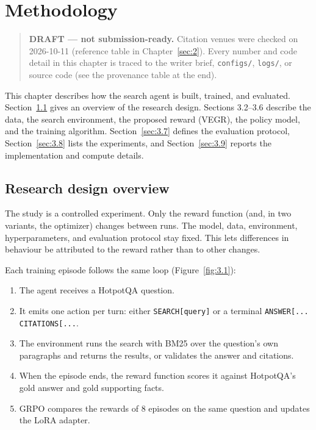 \chapter{Methodology}\label{sec:3}

\begin{quote}
\textbf{DRAFT --- not submission-ready.} Citation venues were checked on
2026-10-11 (reference table in Chapter~\ref{sec:2}). Every number and
code detail in this chapter is traced to the writer brief,
\texttt{configs/\allowbreak{}}, \texttt{logs/\allowbreak{}}, or source
code (see the provenance table at the end).
\end{quote}

This chapter describes how the search agent is built, trained, and
evaluated. Section~\ref{sec:3.1} gives an overview of the research
design. Sections 3.2--3.6 describe the data, the search environment, the
proposed reward (VEGR), the policy model, and the training algorithm.
Section~\ref{sec:3.7} defines the evaluation protocol,
Section~\ref{sec:3.8} lists the experiments, and Section~\ref{sec:3.9}
reports the implementation and compute details.

\section{Research design overview}\label{sec:3.1}

The study is a controlled experiment. Only the reward function (and, in
two variants, the optimizer) changes between runs. The model, data,
environment, hyperparameters, and evaluation protocol stay fixed. This
lets differences in behaviour be attributed to the reward rather than to
other changes.

Each training episode follows the same loop (Figure~\ref{fig:3.1}):

\begin{enumerate}
\def\labelenumi{\arabic{enumi}.}
\tightlist
\item
  The agent receives a HotpotQA question.
\item
  It emits one action per turn: either \texttt{SEARCH{[}query{]}} or a
  terminal
  \texttt{ANSWER{[}.\allowbreak{}.\allowbreak{}.\allowbreak{}{]} CITATIONS{[}.\allowbreak{}.\allowbreak{}.\allowbreak{}{]}}.
\item
  The environment runs the search with BM25 over the question's own
  paragraphs and returns the results, or validates the answer and
  citations.
\item
  When the episode ends, the reward function scores it against
  HotpotQA's gold answer and gold supporting facts.
\item
  GRPO compares the rewards of 8 episodes on the same question and
  updates the LoRA adapter.
\end{enumerate}

